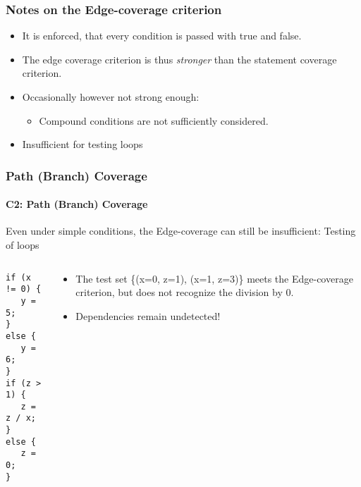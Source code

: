 \begin{frame}
\frametitle{Notes on the Edge-coverage criterion}
\begin{itemize}
  \item It is enforced, that every condition is passed with true and false.
  \item The edge coverage criterion is thus \emph{stronger} than the statement coverage criterion.
  \item Occasionally however not strong enough:
    \begin{itemize}
      \item Compound conditions are not sufficiently considered.
    \end{itemize}
  \item Insufficient for testing loops
\end{itemize}
\end{frame}


\begin{frame}[fragile]
\frametitle{Path (Branch) Coverage}
\framesubtitle{C2: Path (Branch) Coverage}
 Even under simple conditions, the Edge-coverage can still be insufficient: Testing of loops
\begin{columns}
\begin{column}{0.3\textwidth}
\lstset{language=Java,basicstyle=\small}
\begin{lstlisting}
if (x != 0) {
   y = 5;
}
else {
   y = 6;
}
if (z > 1) {
   z = z / x;
}
else {
   z = 0;
}
\end{lstlisting}
\end{column}
\pause
\begin{column}{0.7\textwidth}
\begin{itemize}
  \item The test set \{(x=0, z=1), (x=1, z=3)\} meets the Edge-coverage criterion, but does not recognize the division by 0.
  \item Dependencies remain undetected!
\end{itemize}
\end{column}
\end{columns}
\end{frame}


